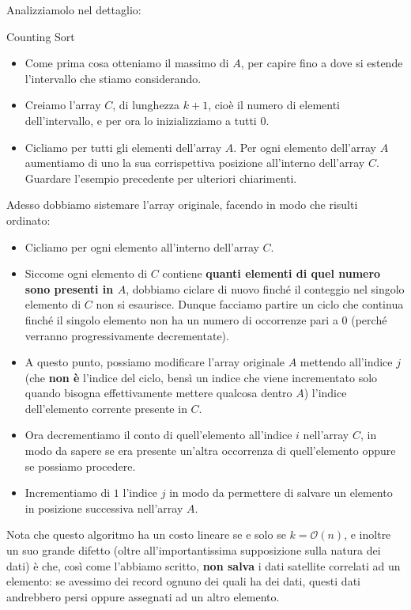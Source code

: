 \documentclass[12pt]{report}
\begin{document}
    Analizziamolo nel dettaglio:
    \begin{algoritmo}{Counting Sort}{}
    	\begin{itemize}
    		\item Come prima cosa otteniamo il massimo di $A$, per capire fino a dove si estende l'intervallo che stiamo considerando.
    		\item Creiamo l'array $C$, di lunghezza $k+1$, cioè il numero di elementi dell'intervallo, e per ora lo inizializziamo a tutti $0$.
    		\item Cicliamo per tutti gli elementi dell'array $A$. Per ogni elemento dell'array $A$ aumentiamo di uno la sua corrispettiva posizione all'interno dell'array $C$. Guardare l'esempio precedente per ulteriori chiarimenti.
    	\end{itemize}
    	
    	Adesso dobbiamo sistemare l'array originale, facendo in modo che risulti ordinato:
    	\begin{itemize}
    		\item Cicliamo per ogni elemento all'interno dell'array $C$.
    		\item Siccome ogni elemento di $C$ contiene \textbf{quanti elementi di quel numero sono presenti in $A$}, dobbiamo ciclare di nuovo finché il conteggio nel singolo elemento di $C$ non si esaurisce. Dunque facciamo partire un ciclo che continua finché il singolo elemento non ha un numero di occorrenze pari a $0$ (perché verranno progressivamente decrementate).
    		\item A questo punto, possiamo modificare l'array originale $A$ mettendo all'indice $j$ (che \textbf{non è} l'indice del ciclo, bensì un indice che viene incrementato solo quando bisogna effettivamente mettere qualcosa dentro $A$) l'indice dell'elemento corrente presente in $C$.
    		\item Ora decrementiamo il conto di quell'elemento all'indice $i$ nell'array $C$, in modo da sapere se era presente un'altra occorrenza di quell'elemento oppure se possiamo procedere.
    		\item Incrementiamo di $1$ l'indice $j$ in modo da permettere di salvare un elemento in posizione successiva nell'array $A$.
    	\end{itemize}
    \end{algoritmo}
    
    Nota che questo algoritmo ha un costo lineare se e solo se $k = \mathcal{O}(n)$, e inoltre un suo grande difetto (oltre all'importantissima supposizione sulla natura dei dati) è che, così come l'abbiamo scritto, \textbf{non salva} i dati satellite correlati ad un elemento: se avessimo dei record ognuno dei quali ha dei dati, questi dati andrebbero persi oppure assegnati ad un altro elemento.
    
\end{document}
